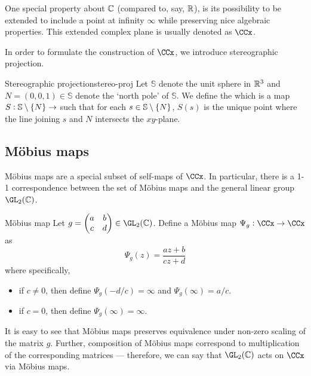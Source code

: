 \documentclass{styles/tufte}
\begin{document}
  One special property about $\mathbb{C}$ (compared to, say, $\mathbb{R}$), is its possibility to be extended to include a point at infinity $\infty$ while preserving nice algebraic properties. This extended complex plane is usually denoted as $\CCx$.
  
  In order to formulate the construction of $\CCx$, we introduce stereographic projection.
  
  \begin{definition}{Stereographic projection}{stereo-proj}
    Let $\mathbb{S}$ denote the unit sphere in $\mathbb{R}^3$ and $N = (0, 0, 1) \in \mathbb{S}$ denote the `north pole' of $\mathbb{S}$. We define the  which is a map $S: \mathbb{S} \setminus \set{N} \to $ such that for each $s \in \mathbb{S} \setminus \set{N}$, $S(s)$ is the unique point where the line joining $s$ and $N$ intersects the $xy$-plane.
  \end{definition}


\subsection{M\"obius maps}

  M\"obius maps are a special subset of self-maps of $\CCx$. In particular, there is a 1-1 correspondence between the set of M\"obius maps and the general linear group $\GL_2(\CC)$.
  
  \begin{definition}{M\"obius map}{}
    Let $g = \begin{pmatrix} a & b \\ c & d \end{pmatrix} \in \GL_2(\CC)$. Define a M\"obius map $\Psi_g: \CCx \to \CCx$ as \\[-0.5em]
    \[ \Psi_g(z) = \frac{az + b}{cz + d} \]
    where specifically,
    \begin{itemize}
      \item if $c \neq 0$, then define $\Psi_g(-d/c) = \infty$ and $\Psi_g(\infty) = a/c$.
      \item if $c = 0$, then define $\Psi_g(\infty) = \infty$.
    \end{itemize}
  \end{definition}
  
  It is easy to see that M\"obius maps preserves equivalence under non-zero scaling of the matrix $g$. Further, composition of M\"obius maps correspond to multiplication of the corresponding matrices --- therefore, we can say that $\GL_2(\CC)$ acts on $\CCx$ via M\"obius maps.
\end{document}
